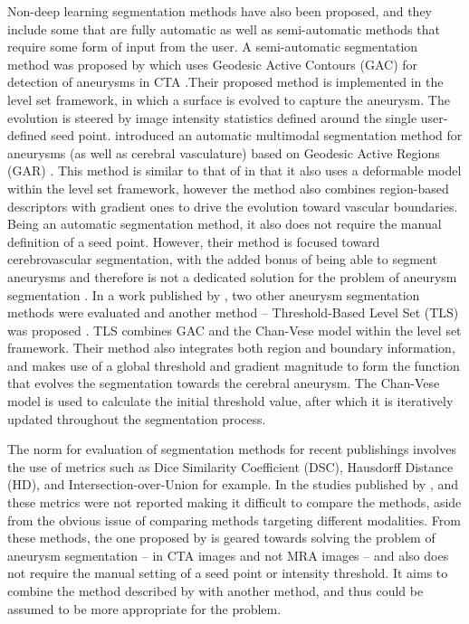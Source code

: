 Non-deep learning segmentation methods have also been proposed, and they include some that are fully automatic as well as semi-automatic methods that require some form of input from the user. A semi-automatic segmentation method was proposed by \citeauthor{Firouzian2011} which uses Geodesic Active Contours (GAC) for detection of aneurysms in CTA \cite{Firouzian2011}.Their proposed method is implemented in the level set framework, in which a surface is evolved to capture the aneurysm. The evolution is steered by image intensity statistics defined around the single user-defined seed point. \citeauthor{Bogunovic2011} introduced an automatic multimodal segmentation method for aneurysms (as well as cerebral vasculature) based on Geodesic Active Regions (GAR) \cite{Bogunovic2011}. This method is similar to that of \citeauthor{Firouzian2011} in that it also uses a deformable model within the level set framework, however the method also combines region-based descriptors with gradient ones to drive the evolution toward vascular boundaries. Being an automatic segmentation method, it also does not require the manual definition of a seed point. However, their method is focused toward cerebrovascular segmentation, with the added bonus of being able to segment aneurysms and therefore is not a dedicated solution for the problem of aneurysm segmentation . In a work published by \citeauthor{Sen2013}, two other aneurysm segmentation methods were evaluated and another method -- Threshold-Based Level Set (TLS) was proposed \cite{Sen2013}. TLS combines GAC and the Chan-Vese model \cite{Chan2001} within the level set framework. Their method also integrates both region and boundary information, and makes use of a global threshold and gradient magnitude to form the function that evolves the segmentation towards the cerebral aneurysm. The Chan-Vese model is used to calculate the initial threshold value, after which it is iteratively updated throughout the segmentation process. 

The norm for evaluation of segmentation methods for recent publishings involves the use of metrics such as Dice Similarity Coefficient (DSC), Hausdorff Distance (HD), and Intersection-over-Union for example. In the studies published by \citeauthor{Firouzian2011}, \citeauthor{Bogunovic2011} and \citeauthor{Sen2013} these metrics were not reported making it difficult to compare the methods, aside from the obvious issue of comparing methods targeting different modalities. From these methods, the one proposed by \citeauthor{Sen2013} is geared towards solving the problem of aneurysm segmentation -- in CTA images and not MRA images -- and also does not require the manual setting of a seed point or intensity threshold. It aims to combine the method described by \citeauthor{Firouzian2011} with another method, and thus could be assumed to be more appropriate for the problem. 


